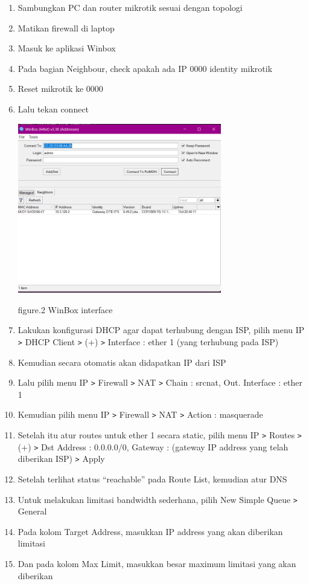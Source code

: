 \begin{enumerate}
    \item Sambungkan PC dan router mikrotik sesuai dengan topologi
    \item Matikan firewall di laptop
    \item Masuk ke aplikasi Winbox
    \item Pada bagian Neighbour, check apakah ada IP 0000 identity mikrotik
    \item Reset mikrotik ke 0000
    \item Lalu tekan connect
    
    \begin{center}
        \includegraphics[width=0.7\textwidth]{image/Winbox-interface.png}    
        
        figure.2 WinBox interface
    \end{center}

    \item Lakukan konfigurasi DHCP agar dapat terhubung dengan ISP, pilih menu IP \texttt{\text>} DHCP Client \texttt{\text>} (+) \texttt{\text>} Interface : ether 1 (yang terhubung pada ISP)
    \item Kemudian secara otomatis akan didapatkan IP dari ISP
    \item Lalu pilih menu IP \texttt{\text>} Firewall \texttt{\text>} NAT \texttt{\text>} Chain : srcnat, Out. Interface : ether 1
    \item Kemudian pilih menu IP \texttt{\text>} Firewall \texttt{\text>} NAT \texttt{\text>} Action : masquerade
    \item Setelah itu atur routes untuk ether 1 secara static, pilih menu IP \texttt{\text>} Routes \texttt{\text>} (+) \texttt{\text>} Dst Address : 0.0.0.0/0, Gateway : (gateway IP address yang telah diberikan ISP) \texttt{\text>} Apply
    \item Setelah terlihat status “reachable” pada Route List, kemudian atur DNS
    \item Untuk melakukan limitasi bandwidth sederhana, pilih New Simple Queue \texttt{\text>} General
    \item Pada kolom Target Address, masukkan IP address yang akan diberikan limitasi
    \item Dan pada kolom Max Limit, masukkan besar maximum limitasi yang akan diberikan
    
\end{enumerate}

